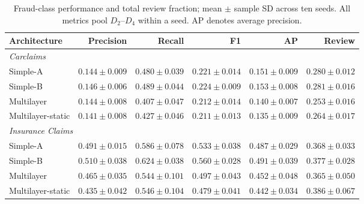 \begin{table}[!htbp]\centering\footnotesize
\caption{Fraud-class performance and total review fraction; mean $\pm$ sample SD across ten seeds. All metrics pool $D_2$--$D_4$ within a seed. AP denotes average precision.}\label{tab:architectures}
\setlength{\tabcolsep}{2pt}
\begin{tabular}{lrrrrr}\toprule
Architecture & Precision & Recall & F1 & AP & Review\\\midrule
\multicolumn{6}{l}{\textit{Carclaims}}\\
Simple-A & $0.144 \pm 0.009$ & $0.480 \pm 0.039$ & $0.221 \pm 0.014$ & $0.151 \pm 0.009$ & $0.280 \pm 0.012$\\
Simple-B & $0.146 \pm 0.006$ & $0.489 \pm 0.044$ & $0.224 \pm 0.009$ & $0.153 \pm 0.008$ & $0.281 \pm 0.016$\\
Multilayer & $0.144 \pm 0.008$ & $0.407 \pm 0.047$ & $0.212 \pm 0.014$ & $0.140 \pm 0.007$ & $0.253 \pm 0.016$\\
Multilayer-static & $0.141 \pm 0.008$ & $0.427 \pm 0.046$ & $0.211 \pm 0.013$ & $0.135 \pm 0.009$ & $0.264 \pm 0.017$\\
\multicolumn{6}{l}{\textit{Insurance Claims}}\\
Simple-A & $0.491 \pm 0.015$ & $0.586 \pm 0.078$ & $0.533 \pm 0.038$ & $0.487 \pm 0.029$ & $0.368 \pm 0.033$\\
Simple-B & $0.510 \pm 0.038$ & $0.624 \pm 0.038$ & $0.560 \pm 0.028$ & $0.491 \pm 0.039$ & $0.377 \pm 0.028$\\
Multilayer & $0.465 \pm 0.035$ & $0.544 \pm 0.101$ & $0.497 \pm 0.043$ & $0.452 \pm 0.048$ & $0.365 \pm 0.050$\\
Multilayer-static & $0.435 \pm 0.042$ & $0.546 \pm 0.104$ & $0.479 \pm 0.041$ & $0.442 \pm 0.034$ & $0.386 \pm 0.067$\\
\bottomrule\end{tabular}
\end{table}
